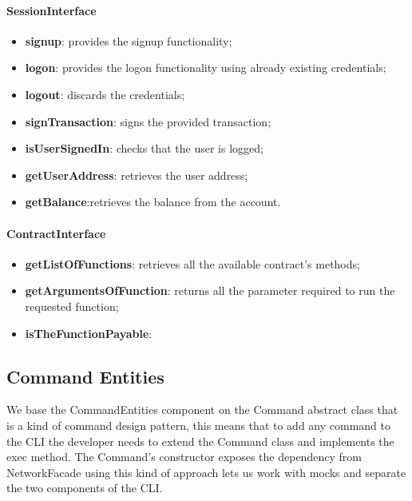 \paragraph{SessionInterface}
\begin{itemize}
    \item \textbf{signup}: provides the signup functionality;
    \item \textbf{logon}: provides the logon functionality using already existing credentials;
    \item \textbf{logout}: discards the credentials;
    \item \textbf{signTransaction}: signs the provided transaction;
    \item \textbf{isUserSignedIn}: checks that the user is logged;
    \item \textbf{getUserAddress}: retrieves the user address;
    \item \textbf{getBalance}:retrieves the balance from the account.
\end{itemize}
\paragraph{ContractInterface}
\begin{itemize}
    \item \textbf{getListOfFunctions}: retrieves all the available contract's methods;
    \item \textbf{getArgumentsOfFunction}: returns all the parameter required to run the requested function;
    \item \textbf{isTheFunctionPayable}: 
\end{itemize}



\subsection{Command Entities}
We base the CommandEntities component on the Command abstract class that is a kind of command design pattern, this means that to add any command to the CLI the developer needs to extend the Command class and implements the exec method.
The Command's constructor exposes the dependency from NetworkFacade using this kind of approach lets us work with mocks and separate the two components of the CLI.
